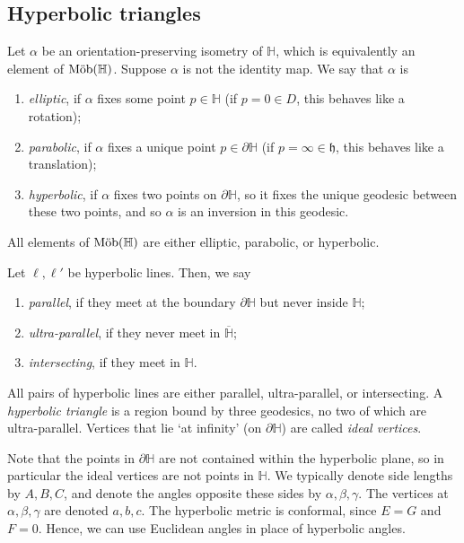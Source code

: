 \subsection{Hyperbolic triangles}
\begin{definition}
	Let \( \alpha \) be an orientation-preserving isometry of \( \mathbb H \), which is equivalently an element of \( \text{M\"ob}(\mathbb H) \).
	Suppose \( \alpha \) is not the identity map.
	We say that \( \alpha \) is
	\begin{enumerate}
		\item \textit{elliptic}, if \( \alpha \) fixes some point \( p \in \mathbb H \) (if \( p = 0 \in D \), this behaves like a rotation);
		\item \textit{parabolic}, if \( \alpha \) fixes a unique point \( p \in \partial \mathbb H \) (if \( p = \infty \in \mathfrak{h} \), this behaves like a translation);
		\item \textit{hyperbolic}, if \( \alpha \) fixes two points on \( \partial \mathbb H \), so it fixes the unique geodesic between these two points, and so \( \alpha \) is an inversion in this geodesic.
	\end{enumerate}
	All elements of \( \text{M\"ob}(\mathbb H) \) are either elliptic, parabolic, or hyperbolic.
\end{definition}
\begin{definition}
	Let \( \ell, \ell' \) be hyperbolic lines.
	Then, we say
	\begin{enumerate}
		\item \textit{parallel}, if they meet at the boundary \( \partial \mathbb H \) but never inside \( \mathbb H \);
		\item \textit{ultra-parallel}, if they never meet in \( \overline{\mathbb H} \);
		\item \textit{intersecting}, if they meet in \( \mathbb H \).
	\end{enumerate}
	All pairs of hyperbolic lines are either parallel, ultra-parallel, or intersecting.
	A \textit{hyperbolic triangle} is a region bound by three geodesics, no two of which are ultra-parallel.
	Vertices that lie `at infinity' (on \( \partial \mathbb H \)) are called \textit{ideal vertices}.
\end{definition}
Note that the points in \( \partial \mathbb H \) are not contained within the hyperbolic plane, so in particular the ideal vertices are not points in \( \mathbb H \).
We typically denote side lengths by \( A, B, C \), and denote the angles opposite these sides by \( \alpha, \beta, \gamma \).
The vertices at \( \alpha, \beta, \gamma \) are denoted \( a, b, c \).
The hyperbolic metric is conformal, since \( E = G \) and \( F = 0 \).
Hence, we can use Euclidean angles in place of hyperbolic angles.

